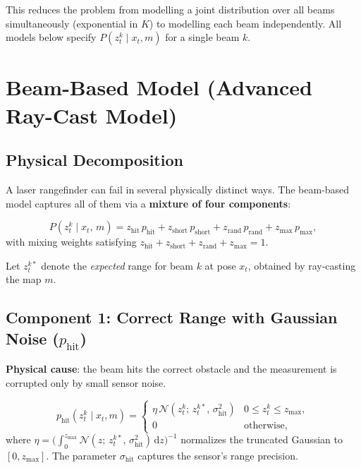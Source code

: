 \documentclass[11pt,a4paper]{article}
\theoremstyle{definition}
\theoremstyle{plain}
\theoremstyle{remark}
\begin{document}
This reduces the problem from modelling a joint distribution over all beams simultaneously (exponential in $K$) to modelling each beam independently. All models below specify $P(z_t^k \mid x_t, m)$ for a single beam $k$.

\section{Beam-Based Model (Advanced Ray-Cast Model)}

\subsection{Physical Decomposition}

A laser rangefinder can fail in several physically distinct ways. The beam-based model captures all of them via a \textbf{mixture of four components}:

\begin{tcolorbox}[colback=blue!5!white,colframe=blue!75!black,title=\textbf{Beam-Based Mixture Model}]
\[
    P(z_t^k \mid x_t,\, m)
    = z_{\mathrm{hit}}\, p_{\mathrm{hit}}
    + z_{\mathrm{short}}\, p_{\mathrm{short}}
    + z_{\mathrm{rand}}\, p_{\mathrm{rand}}
    + z_{\mathrm{max}}\, p_{\mathrm{max}}, %
\]
with mixing weights satisfying $z_{\mathrm{hit}} + z_{\mathrm{short}} + z_{\mathrm{rand}} + z_{\mathrm{max}} = 1$. %
\end{tcolorbox}

Let $z_t^{k*}$ denote the \emph{expected} range for beam $k$ at pose $x_t$, obtained by ray-casting the map $m$.

\subsection{Component 1: Correct Range with Gaussian Noise ($p_{\mathrm{hit}}$)}

\textbf{Physical cause}: the beam hits the correct obstacle and the measurement is corrupted only by small sensor noise.

\[
    p_{\mathrm{hit}}(z_t^k \mid x_t, m) =
    \begin{cases}
        \eta\,\mathcal{N}(z_t^k;\, z_t^{k*},\, \sigma_{\mathrm{hit}}^2) & 0 \le z_t^k \le z_{\mathrm{max}}, \\ %
        0 & \text{otherwise,}
    \end{cases}
\]
where $\eta = \bigl(\int_0^{z_{\mathrm{max}}} \mathcal{N}(z;\, z_t^{k*},\, \sigma_{\mathrm{hit}}^2)\,\mathrm{d}z\bigr)^{-1}$ normalizes the truncated Gaussian to $[0, z_{\mathrm{max}}]$. The parameter $\sigma_{\mathrm{hit}}$ captures the sensor's range precision. %
\end{document}

